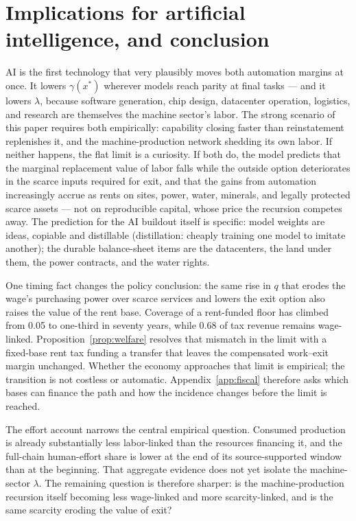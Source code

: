 \documentclass[12pt]{article}
\theoremstyle{plain}
\begin{document}
\section{Implications for artificial intelligence, and conclusion}\label{sec:ai}

AI is the first technology that very plausibly moves both automation margins at once. It lowers $\gamma (x^*)$ wherever models reach parity at final tasks --- and it lowers $\lambda$, because software generation, chip design, datacenter operation, logistics, and research are themselves the machine sector's labor. The strong scenario of this paper requires both empirically: capability closing faster than reinstatement replenishes it, and the machine-production network shedding its own labor. If neither happens, the flat limit is a curiosity. If both do, the model predicts that the marginal replacement value of labor falls while the outside option deteriorates in the scarce inputs required for exit, and that the gains from automation increasingly accrue as rents on sites, power, water, minerals, and legally protected scarce assets --- not on reproducible capital, whose price the recursion competes away. The prediction for the AI buildout itself is specific: model weights are ideas, copiable and distillable (distillation: cheaply training one model to imitate another); the durable balance-sheet items are the datacenters, the land under them, the power contracts, and the water rights.

One timing fact changes the policy conclusion: the same rise in $q$ that erodes the wage's purchasing power over scarce services and lowers the exit option also raises the value of the rent base. Coverage of a rent-funded floor has climbed from 0.05 to one-third in seventy years, while 0.68 of tax revenue remains wage-linked. Proposition~\ref{prop:welfare} resolves that mismatch in the limit with a fixed-base rent tax funding a transfer that leaves the compensated work--exit margin unchanged. Whether the economy approaches that limit is empirical; the transition is not costless or automatic. Appendix~\ref{app:fiscal} therefore asks which bases can finance the path and how the incidence changes before the limit is reached.

The effort account narrows the central empirical question. Consumed production is already substantially less labor-linked than the resources financing it, and the full-chain human-effort share is lower at the end of its source-supported window than at the beginning. That aggregate evidence does not yet isolate the machine-sector $\lambda$. The remaining question is therefore sharper: is the machine-production recursion itself becoming less wage-linked and more scarcity-linked, and is the same scarcity eroding the value of exit?
\end{document}

